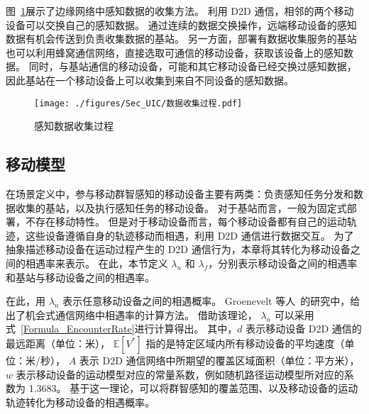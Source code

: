 图~\ref{Figure_FeedbacksCollection}展示了边缘网络中感知数据的收集方法。
利用 D2D 通信，相邻的两个移动设备可以交换自己的感知数据。
通过连续的数据交换操作，远端移动设备的感知数据有机会传送到负责收集数据的基站。
另一方面，部署有数据收集服务的基站也可以利用蜂窝通信网络，直接选取可通信的移动设备，获取该设备上的感知数据。
同时，与基站通信的移动设备，可能和其它移动设备已经交换过感知数据，因此基站在一个移动设备上可以收集到来自不同设备的感知数据。


\begin{figure}[!h]
  \centering
  \texttt{[image: ./figures/Sec\_UIC/数据收集过程.pdf]}
  \vspace{-0.5em}
  \caption{感知数据收集过程}
  \vspace{-1.5em}
  \label{Figure_FeedbacksCollection}
\end{figure}

\subsection{移动模型}

在场景定义中，参与移动群智感知的移动设备主要有两类：负责感知任务分发和数据收集的基站，以及执行感知任务的移动设备。
对于基站而言，一般为固定式部署，不存在移动特性。
但是对于移动设备而言，每个移动设备都有自己的运动轨迹，这些设备遵循自身的轨迹移动而相遇，利用 D2D 通信进行数据交互。
为了抽象描述移动设备在运动过程产生的 D2D 通信行为，本章将其转化为移动设备之间的相遇率来表示。
在此，本节定义 $\lambda_n$ 和 $\lambda_f$，分别表示移动设备之间的相遇率和基站与移动设备之间的相遇率。

在此，用 $\lambda_n$ 表示任意移动设备之间的相遇概率。
Groenevelt 等人~\cite{DBLP:journals/pe/GroeneveltNK05}的研究中，给出了机会式通信网络中相遇率的计算方法。
借助该理论， $\lambda_n$ 可以采用式~\eqref{Formula_EncounterRate}进行计算得出。
其中，$d$ 表示移动设备 D2D 通信的最远距离（单位：米），
$\mathbb{E}[V^*]$ 指的是特定区域内所有移动设备的平均速度（单位：米/秒），
$A$ 表示 D2D 通信网络中所期望的覆盖区域面积（单位：平方米），
$w$ 表示移动设备的运动模型对应的常量系数，例如随机路径运动模型所对应的系数为 1.3683。
基于这一理论，可以将群智感知的覆盖范围、以及移动设备的运动轨迹转化为移动设备的相遇概率。


